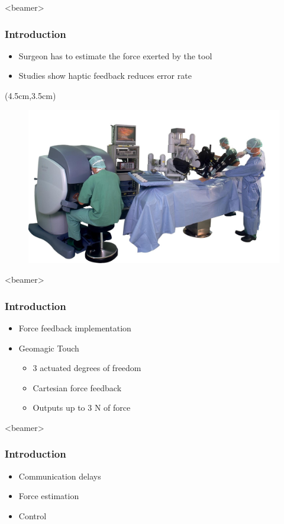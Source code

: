 \begin{frame}<beamer>
\frametitle{Introduction}
\begin{itemize}
\item Surgeon has to estimate the force exerted by the tool
\item Studies show haptic feedback reduces error rate
\end{itemize}

\begin{textblock*}{0.7\textwidth}(4.5cm,3.5cm) %
  \begin{figure}[H]
  	\centering
  		\centering
  		\includegraphics[width=1\textwidth]{Billeder/Dan/davinci.jpg}
  \end{figure}
\end{textblock*}

\end{frame}

\begin{frame}<beamer>
\frametitle{Introduction}
\begin{itemize}
\item Force feedback implementation
\item Geomagic Touch 
\begin{itemize}
\item 3 actuated degrees of freedom 
\item Cartesian force feedback
\item Outputs up to 3 N of force
\end{itemize}
\end{itemize}
\end{frame}

\begin{frame}<beamer>
\frametitle{Introduction}
\begin{itemize}
\item Communication delays
\item Force estimation
\item Control
\end{itemize}
\end{frame}